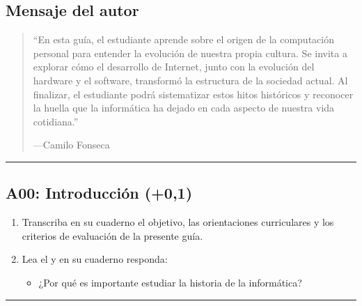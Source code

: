 \documentclass[letterpaper,10pt,spanish]{sphinxmanual}
\begin{document}
\subsection{Mensaje del autor}
\label{\detokenize{1_guias/10informatica/G1001:mensaje-del-autor}}\begin{quote}

\sphinxAtStartPar
“En esta guía, el estudiante aprende sobre el origen de la computación personal para entender la evolución de nuestra propia cultura. Se invita a explorar cómo el desarrollo de Internet, junto con la evolución del hardware y el software, transformó la estructura de la sociedad actual. Al finalizar, el estudiante podrá sistematizar estos hitos históricos y reconocer la huella que la informática ha dejado en cada aspecto de nuestra vida cotidiana.”

\begin{flushright}
---Camilo Fonseca
\end{flushright}
\end{quote}


\bigskip\hrule\bigskip



\subsection{A00: Introducción (+0,1)}
\label{\detokenize{1_guias/10informatica/G1001:a00-introduccion-0-1}}
\sphinxAtStartPar
{}
\begin{enumerate}
%
\item {} 
\sphinxAtStartPar
Transcriba en su cuaderno el objetivo, las orientaciones curriculares y los criterios de evaluación de la presente guía.

\item {} 
\sphinxAtStartPar
Lea el  y en su cuaderno responda:
\begin{itemize}
\item {} 
\sphinxAtStartPar
¿Por qué es importante estudiar la historia de la informática?

\end{itemize}

\end{enumerate}


\bigskip\hrule\bigskip
\end{document}
